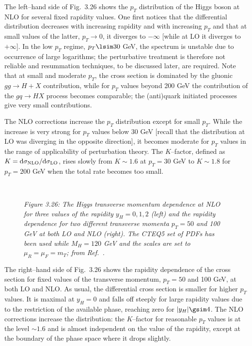 The left--hand side of Fig.~3.26 shows the $p_T$ distribution of the Higgs
boson at NLO for several fixed rapidity values. One first notices that the
differential distribution decreases with increasing rapidity and with
increasing  $p_T$ and that at small values of the latter, $p_T \to 0$, it
diverges to $-\infty$ [while at LO it diverges to $+ \infty$]. In the low
$p_T$ regime, $p_T\lsim 30$ GeV, the spectrum is unstable due to occurrence of 
large logarithms; the perturbative treatment  is therefore not reliable and
resummation techniques, to be discussed later, are required. Note that at small
and moderate $p_T$, the cross section is dominated by the gluonic $gg \to H+X$
contribution, while for $p_T$ values beyond 200 GeV  the contribution of the
$gq \to HX$ process becomes comparable; the (anti)quark initiated processes
give very small contributions. \s

The NLO corrections increase the $p_T$ distribution except for small $p_T$. 
While the increase is very strong for $p_T$ values below 30 GeV [recall that
the  distribution at LO was diverging in the opposite direction], it becomes
moderate for $p_T$ values in the range of applicability of perturbation theory.
The $K$--factor, defined as $K = {\rm d} \sigma_{\rm NLO}/ {\rm d} \sigma_{\rm
LO}$, rises slowly from $K \sim 1.6$ at $p_T=30$ GeV to $K \sim 1.8$ for
$p_T=200$ GeV when the total rate becomes too small.%

\begin{figure}[h!]
\begin{center}
\mbox{
\epsfxsize=7.9cm \hspace*{3mm}
\epsfxsize=7.9cm } \\[-5mm]
\end{center}
\vspace*{-2mm}
{\it Figure 3.26: The Higgs transverse momentum dependence at NLO for three 
values of the rapidity $y_H=0,1,2$ (left) and the rapidity dependence for two 
different transverse momenta $p_T=50$ and 100 GeV at both LO and NLO (right). 
The CTEQ5 set of PDFs has been used while $M_H=120$ GeV and the scales are 
set to $\mu_R=\mu_F= m_T$; from Ref.~\cite{Pt-eta-distrib}.}
\vspace*{-2mm}
\end{figure}

The right--hand side of Fig.~3.26 shows the rapidity dependence of the cross
section for fixed values of the transverse momentum, $p_T=50$ and 100 GeV, at
both LO and NLO. As usual, the differential cross section is smaller for higher
$p_T$ values. It is maximal at $y_H=0$ and falls off steeply  for large
rapidity values due to the restriction of the available phase, reaching zero
for  $|y_H| \gsim 4$. The NLO corrections increase the distribution: the
$K$--factor for reasonable $p_T$ values is at the level $\sim 1.6$ and is
almost independent on the value of the rapidity, except at the boundary of the
phase space where it drops slightly.\

